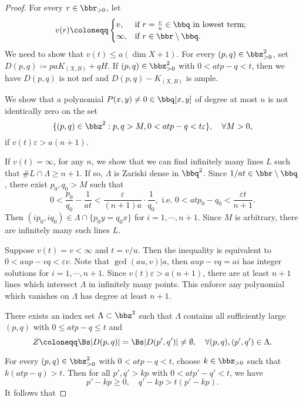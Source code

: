     \begin{proof}
        For every \(r \in \bbr_{> 0}\), let 
        \[ v(r) \coloneqq \begin{cases}
            v, & \text{if } r = \frac{v}{u} \in \bbq \text{ in lowest term; } \\
            \infty, & \text{if } r \in \bbr\setminus \bbq.
        \end{cases} \]
        We need to show that \(v(t) \leq a(\dim X + 1)\).
        For every \((p,q) \in \bbz_{>0}^2\), set \(D(p,q) \coloneqq paK_{(X,B)} + qH\).
        If \((p,q)\in \bbz^2_{>0}\) with \(0< atp-q < t\), then we have \(D(p,q)\) is not nef and \(D(p,q) - K_{(X,B)}\) is ample.

        \begin{step}\label{step_in_thm:rationality_theorem:polynomial_non-vanishing_on_strips}
            We show that a polynomial \(P(x,y) \neq 0 \in \bbq[x,y]\) of degree at most \(n\) is not identically zero on the set
            \[  \{(p,q) \in \bbz^2 : p,q>M, 0< atp-q < t\varepsilon\}, \quad \forall M > 0, \] 
            if \(v(t)\varepsilon > a(n+1)\). 
        \end{step}
        If \(v(t) = \infty\), for any \(n\), we show that we can find infinitely many lines \(L\) such that \(\#L\cap \Lambda \geq n+1\).
        If so, \(\Lambda\) is Zariski dense in \(\bbq^2\).
        Since \(1/at\in \bbr\setminus \bbq\), there exist \(p_0,q_0>M\) such that 
        \[ 0 < \frac{p_0}{q_0} - \frac{1}{at} < \frac{\varepsilon}{(n+1)a} \cdot \frac{1}{q_0}, \text{ i.e. } 0<atp_0 - q_0 < \frac{\varepsilon t}{n+1}. \]
        Then \((ip_0,iq_0) \in \Lambda \cap \{p_0y=q_0x\}\) for \(i = 1,\cdots,n+1\).
        Since \(M\) is arbitrary, there are infinitely many such lines \(L\).
        
        Suppose \(v(t) = v < \infty\) and \(t = v/u\).
        Then the inequality is equivalent to \(0 < aup - vq < \varepsilon v\).
        Note that \(\gcd(au,v) | a\), then \(aup - vq = a i\) has integer solutions for \(i = 1,\cdots,n+1\).
        Since \(v(t)\varepsilon > a(n+1)\), there are at least \(n+1\) lines which intersect \(\Lambda\) in infinitely many points.
        This enforce any polynomial which vanishes on \(\Lambda\) has degree at least \(n+1\).

        \begin{step}
            There exists an index set \(\Lambda \subset \bbz^2\) such that \(\Lambda\) contains all sufficiently large \((p,q)\) with \(0 \leq at p - q \leq t\) and 
            \[ Z \coloneqq \Bs |D(p,q)| = \Bs |D(p',q')| \neq \emptyset, \quad \forall (p,q), (p',q') \in \Lambda. \]
        \end{step}
        For every \((p,q) \in \bbz^2_{>0}\) with \(0 < atp-q < t\), choose \(k \in \bbz_{>0}\) such that \(k(atp - q) > t\).
        Then for all \(p', q' > kp\) with \(0 < atp'-q' < t\), we have 
        \[ p' - kp \geq 0, \quad q'-kp > t(p'-kp). \]
        It follows that 
        

\end{proof}
